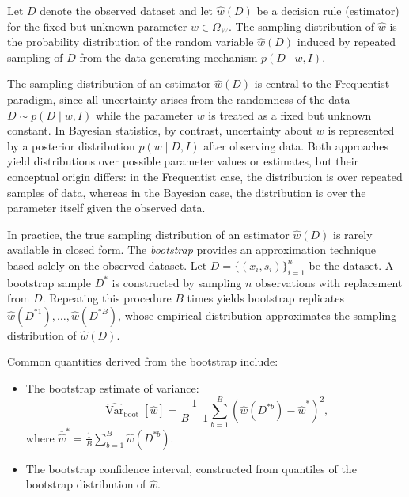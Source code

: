 \begin{definition}
	Let $D$ denote the observed dataset and let $\hat{w}(D)$ be a decision rule (estimator) for the fixed-but-unknown parameter $w\in\Omega_W$. The sampling distribution of $\hat{w}$ is the probability distribution of the random variable $\hat{w}(D)$ induced by repeated sampling of $D$ from the data-generating mechanism $p(D \mid w,I)$.	
\end{definition}

\begin{remark}
	The sampling distribution of an estimator $\hat{w}(D)$ is central to the Frequentist paradigm, since all uncertainty arises from the randomness of the data $D \sim p(D \mid w,I)$ while the parameter $w$ is treated as a fixed but unknown constant. In Bayesian statistics, by contrast, uncertainty about $w$ is represented by a posterior distribution $p(w \mid D, I)$ after observing data. Both approaches yield distributions over possible parameter values or estimates, but their conceptual origin differs: in the Frequentist case, the distribution is over repeated samples of data, whereas in the Bayesian case, the distribution is over the parameter itself given the observed data.
\end{remark}

\begin{example}
	In practice, the true sampling distribution of an estimator $\hat{w}(D)$ is rarely available in closed form. The \emph{bootstrap} provides an approximation technique based solely on the observed dataset. Let $D = \{(x_i,s_i)\}_{i=1}^n$ be the dataset. A bootstrap sample $D^{*}$ is constructed by sampling $n$ observations with replacement from $D$. Repeating this procedure $B$ times yields bootstrap replicates $\hat{w}(D^{*1}), \ldots, \hat{w}(D^{*B})$, whose empirical distribution approximates the sampling distribution of $\hat{w}(D)$. 
	
	Common quantities derived from the bootstrap include:
	\begin{itemize}
		\item The bootstrap estimate of variance:
		\begin{equation}
			\widehat{\operatorname{Var}}_{\mathrm{boot}}[\hat{w}] = \frac{1}{B-1}\sum_{b=1}^B \left(\hat{w}(D^{*b}) - \overline{\hat{w}}^{*}\right)^2,
		\end{equation}
		where $\overline{\hat{w}}^{*} = \frac{1}{B}\sum_{b=1}^B \hat{w}(D^{*b})$.
		\item The bootstrap confidence interval, constructed from quantiles of the bootstrap distribution of $\hat{w}$.
	\end{itemize}
\end{example}


